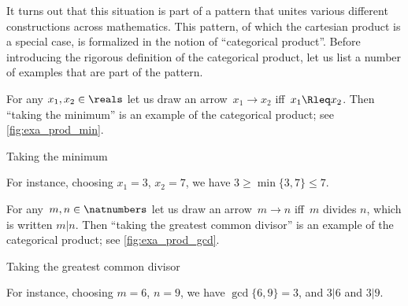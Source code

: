 %


It turns out that this situation is part of a pattern that unites various different constructions across mathematics. This pattern, of which the cartesian product is a special case, is formalized in the notion of ``categorical product''. Before introducing the rigorous definition of the categorical product, let us list a number of examples that are part of the pattern. 


\begin{example}\label{exa:min-as-prod}
For any $x_1,x_2\in \reals$ let us draw an arrow~$x_1\to x_2$ iff~$x_1\Rleq x_2$. Then ``taking the minimum''  is an example of the categorical product; see \cref{fig:exa_prod_min}. 
  \begin{marginfigure}
  \begin{center}
  \end{center}
    \caption{Taking the minimum}
    \label{fig:exa_prod_min}
  \end{marginfigure}
For instance, choosing $x_1 = 3$, $x_2 = 7$, we have $3 \geq \min \{3, 7\} \leq 7$. 
\end{example}

\begin{example}\label{exa:gcd-as-prod}
For any~$m, n \in \natnumbers$ let us draw an arrow~$m \to n$ iff~$m$ divides $n$, which is written $m | n$. Then ``taking the greatest common divisor'' is an example of the categorical product; see \cref{fig:exa_prod_gcd}. 
  \begin{marginfigure}
  \begin{center}
  \end{center}
    \caption{Taking the greatest common divisor}
    \label{fig:exa_prod_gcd}
  \end{marginfigure}
 For instance, choosing $m = 6$, $n = 9$, we have $\gcd \{6, 9 \} = 3$, and $3 | 6$ and $3 | 9$. 
\end{example}

